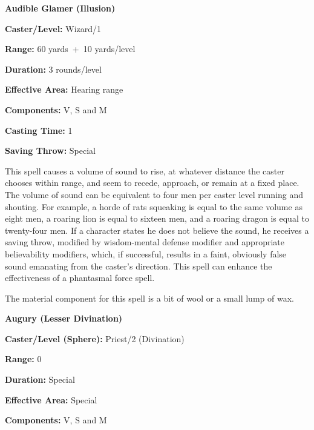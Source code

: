 \begin{multicols}{2}
\vspace{1em}

\noindent
\begin{minipage}{\columnwidth}

\noindent \textbf{Audible Glamer (Illusion)}

\noindent \textbf{Caster/Level:} Wizard/1

\noindent \textbf{Range:} 60 yards~+~10 yards/level

\noindent \textbf{Duration:} 3 rounds/level

\noindent \textbf{Effective Area:} Hearing range

\noindent \textbf{Components:} V, S and M

\noindent \textbf{Casting Time:} 1

\noindent \textbf{Saving Throw:} Special

\end{minipage}

This spell causes a volume of sound to rise, at whatever distance the caster chooses within range, and seem to recede, approach, or remain at a fixed place.  The volume of sound can be equivalent to four men per caster level running and shouting.  For example, a horde of rats squeaking is equal to the same volume as eight men, a roaring lion is equal to sixteen men, and a roaring dragon is equal to twenty-four men.  If a character states he does not believe the sound, he receives a saving throw, modified by wisdom-mental defense modifier and appropriate believability modifiers, which, if successful, results in a faint, obviously false sound emanating from the caster's direction.  This spell can enhance the effectiveness of a phantasmal force spell.

The material component for this spell is a bit of wool or a small lump of wax.

\vspace{1em}

\noindent
\begin{minipage}{\columnwidth}

\noindent \textbf{Augury (Lesser Divination)}

\noindent \textbf{Caster/Level (Sphere):} Priest/2 (Divination)

\noindent \textbf{Range:} 0

\noindent \textbf{Duration:} Special

\noindent \textbf{Effective Area:} Special

\noindent \textbf{Components:} V, S and M


\end{minipage}
\end{multicols}
